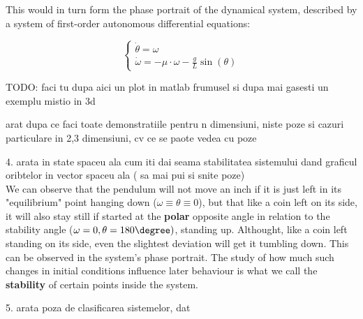 This would in turn form the phase portrait of the dynamical system, described by a system of first-order autonomous differential equations:

\[
    \begin{cases}
        \dot{\theta}  = \omega \\
        \dot{\omega} = -\mu \cdot \omega - \frac{g}{L}\sin(\theta)
    \end{cases}
\]

\par
TODO: faci tu dupa aici un plot in matlab frumusel
si dupa mai gasesti un exemplu mistio in 3d

arat dupa ce faci toate demonstratiile pentru n dimensiuni, niste poze si cazuri particulare in 2,3 dimensiuni, cv ce se paote vedea cu poze



4. arata in state spaceu ala cum iti dai seama stabilitatea sistemului dand graficul oribtelor in vector spaceu ala ( sa mai pui si snite poze)\\

We can observe that the pendulum will not move an inch if it is just left in its "equilibrium" point hanging down ($\omega \equiv \theta \equiv 0$), but that like a coin left on its side, it will also stay still if started at the \textbf{polar} opposite angle in relation to the stability angle ($\omega =0 , \theta = 180 \degree)$, standing up.
Althought, like a coin left standing on its side, even the slightest deviation will get it tumbling down. This can be observed in the system's phase portrait. The study of how much such changes in initial conditions influence later behaviour is what we call the \textbf{stability} of certain points inside the system.

5. arata poza de clasificarea sistemelor, dat \\



